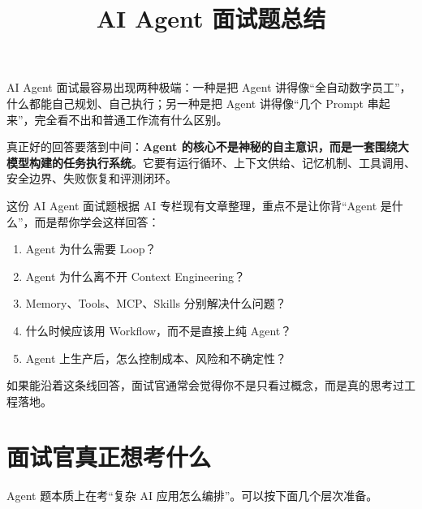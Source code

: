 \documentclass[9pt,a4paper,twocolumn]{ctexart}
\begin{document}
\title{AI Agent 面试题总结}
\date{}
\maketitle
{}

AI Agent 面试最容易出现两种极端：一种是把 Agent 讲得像“全自动数字员工”，什么都能自己规划、自己执行；另一种是把 Agent 讲得像“几个 Prompt 串起来”，完全看不出和普通工作流有什么区别。



真正好的回答要落到中间：\textbf{Agent 的核心不是神秘的自主意识，而是一套围绕大模型构建的任务执行系统}。它要有运行循环、上下文供给、记忆机制、工具调用、安全边界、失败恢复和评测闭环。



这份 AI Agent 面试题根据 AI 专栏现有文章整理，重点不是让你背“Agent 是什么”，而是帮你学会这样回答：


\begin{enumerate}[itemsep=1pt, topsep=2pt]
  \item Agent 为什么需要 Loop？
  \item Agent 为什么离不开 Context Engineering？
  \item Memory、Tools、MCP、Skills 分别解决什么问题？
  \item 什么时候应该用 Workflow，而不是直接上纯 Agent？
  \item Agent 上生产后，怎么控制成本、风险和不确定性？
\end{enumerate}


如果能沿着这条线回答，面试官通常会觉得你不是只看过概念，而是真的思考过工程落地。



\section*{面试官真正想考什么}


Agent 题本质上在考“复杂 AI 应用怎么编排”。可以按下面几个层次准备。
\end{document}
